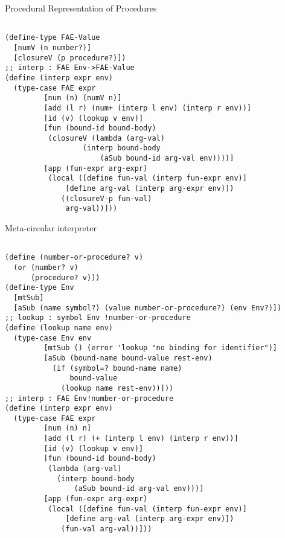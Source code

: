 \documentclass[12pt]{article}
\newcommand{\bfr}[1]{\newpage\centerline{#1}}
\begin{document}
\bfr{Procedural Representation of Procedures}

\begin{lstlisting}

(define-type FAE-Value
  [numV (n number?)]
  [closureV (p procedure?)])
;; interp : FAE Env->FAE-Value
(define (interp expr env)
  (type-case FAE expr
	     [num (n) (numV n)]
	     [add (l r) (num+ (interp l env) (interp r env))]
	     [id (v) (lookup v env)]
	     [fun (bound-id bound-body)
		  (closureV (lambda (arg-val)
			      (interp bound-body
				      (aSub bound-id arg-val env))))]
	     [app (fun-expr arg-expr)
		  (local ([define fun-val (interp fun-expr env)]
			  [define arg-val (interp arg-expr env)])
			 ((closureV-p fun-val)
			  arg-val))]))

\end{lstlisting}

\bfr{Meta-circular interpreter}
\begin{lstlisting}

(define (number-or-procedure? v)
  (or (number? v)
      (procedure? v)))
(define-type Env
  [mtSub]
  [aSub (name symbol?) (value number-or-procedure?) (env Env?)])
;; lookup : symbol Env !number-or-procedure
(define (lookup name env)
  (type-case Env env
	     [mtSub () (error 'lookup "no binding for identifier")]
	     [aSub (bound-name bound-value rest-env)
		   (if (symbol=? bound-name name)
		       bound-value
		     (lookup name rest-env))]))
;; interp : FAE Env!number-or-procedure
(define (interp expr env)
  (type-case FAE expr
	     [num (n) n]
	     [add (l r) (+ (interp l env) (interp r env))]
	     [id (v) (lookup v env)]
	     [fun (bound-id bound-body)
		  (lambda (arg-val)
		    (interp bound-body
			    (aSub bound-id arg-val env)))]
	     [app (fun-expr arg-expr)
		  (local ([define fun-val (interp fun-expr env)]
			  [define arg-val (interp arg-expr env)])
			 (fun-val arg-val))]))

\end{lstlisting}
\end{document}
